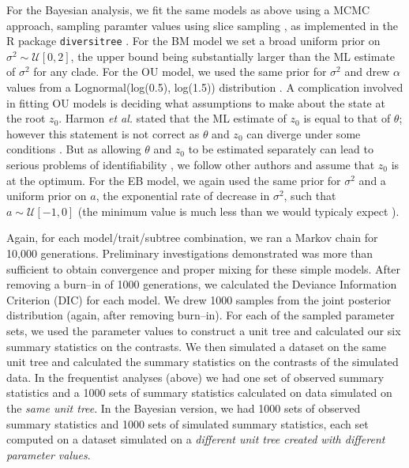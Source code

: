 \documentclass[a4paper,12pt]{article}
\begin{document}
For the Bayesian analysis, we fit the same models as above using a MCMC approach, sampling paramter values using slice sampling \citep{Nealslice}, as implemented in the R package \texttt{diversitree} \citep{FitzJohn2012}. For the BM model we set a broad uniform prior on $\sigma^2 \sim \mathcal{U}[0, 2]$, the upper bound being substantially larger than the ML estimate of $\sigma^2$ for any clade. For the OU model, we used the same prior for $\sigma^2$ and drew $\alpha$ values from a Lognormal(log(0.5), log(1.5)) distribution \citep{UyedaBayou}. A complication involved in fitting OU models is deciding what assumptions to make about the state at the root $z_0$. Harmon \textit{et al.} \citep{Harmon2010} stated that the ML estimate of $z_0$ is equal to that of $\theta$; however this statement is not correct as $\theta$ and $z_0$ can diverge under some conditions \citep{HoAne2012}. But as allowing $\theta$ and $z_0$ to be estimated separately can lead to serious problems of identifiability \citep{HoAne2012}, we follow other authors \citep{Labra2009, Beaulieu2012} and assume that $z_0$ is at the optimum. For the EB model, we again used the same prior for $\sigma^2$ and a uniform prior on $a$, the exponential rate of decrease in $\sigma^2$, such that $a \sim \mathcal{U}[-1, 0]$ (the minimum value is much less than we would typicaly expect \citep{SlaterPennell}).

Again, for each model/trait/subtree combination, we ran a Markov chain for 10,000 generations. Preliminary investigations demonstrated was more than sufficient to obtain convergence and proper mixing for these simple models. After removing a burn--in of 1000 generations, we calculated the Deviance Information Criterion (DIC) \citep{dic} for each model. We drew 1000 samples from the joint posterior distribution (again, after removing burn--in). For each of the sampled parameter sets, we used the parameter values to construct a unit tree and calculated our six summary statistics on the contrasts. We then simulated a dataset on the same unit tree and calculated the summary statistics on the contrasts of the simulated data. In the frequentist analyses (above) we had one set of observed summary statistics and a 1000 sets of summary statistics calculated on data simulated on the \emph{same unit tree}. In the Bayesian version, we had 1000 sets of observed summary statistics and 1000 sets of simulated summary statistics, each set computed on a dataset simulated on a \emph{different unit tree created with different parameter values}.
 
\end{document}
